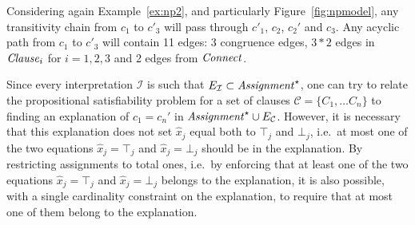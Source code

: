 \documentclass[smallextended]{svjour3}
\begin{document}
\noindent 
Considering again Example~\ref{ex:np2}, and particularly
Figure~\ref{fig:npmodel}, any transitivity chain from $c_1$ to
$c'_3$ will pass through $c'_1$, $c_2$, $c_2'$ and
$c_3$.  Any acyclic path from $c_1$ to $c'_3$ will contain 11
edges: 3 congruence edges, $3*2$ edges in ${\it Clause}_i$ for $i=1,2,3$
and 2 edges from ${\it Connect}$.

Since every interpretation $\mathcal{I}$ is such that $E_{\mathcal{I}} \subset
{\it Assignment}^\star$, one can try to relate the propositional satisfiability
problem for a set of clauses $\mathcal{C}= \{C_1, \dots C_n\}$ to finding an
explanation of $c_1 = c_n'$ in ${\it Assignment}^\star \cup
E_{\mathcal{C}}$.  However, it is necessary that this explanation does not set
$\hat{x}_j$ equal both to $\top_j$ and $\bot_j$, i.e.\ at most one of the two
equations $\hat{x}_j = \top_j$ and $\hat{x}_j = \bot_j$ should be in the
explanation.  By restricting assignments to total ones, i.e.\ by enforcing that
at least one of the two equations $\hat{x}_j = \top_j$ and $\hat{x}_j = \bot_j$
belongs to the explanation, it is also possible, with a single cardinality
constraint on the explanation, to require that at most one of them belong to the
explanation.
\end{document}
